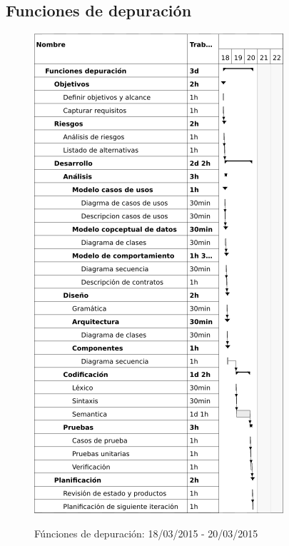 \subsection{Funciones de depuración}
\begin{center}
\begin{figure}[H]
\centering
\includegraphics[scale=1]{planning/17-funciones-depuracion.png} \\
\caption{Fúnciones de depuración: 18/03/2015 - 20/03/2015 }
\end{figure}
\end{center}


